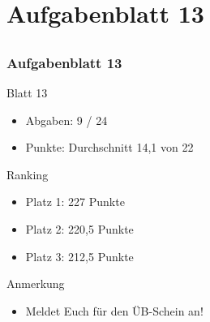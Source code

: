 \section[Rückblick]{Aufgabenblatt 13}
\subsection*{}
\begin{frame}
	\frametitle{Aufgabenblatt 13}
	\begin{block}{Blatt 13}
		\begin{itemize}
			\item Abgaben: 9 / 24
			\item Punkte: Durchschnitt 14,1 von 22
		\end{itemize}
   \end{block}
	\begin{block}{Ranking}
 		\begin{itemize}
 	  		\item Platz 1: 227 Punkte
 	  		\item Platz 2: 220,5 Punkte
			\item Platz 3: 212,5 Punkte
 	  \end{itemize}
	\end{block}
  \pause
	\begin{block}{Anmerkung}
  	\begin{itemize}
			\item Meldet Euch für den ÜB-Schein an!
		\end{itemize}
	\end{block}
\end{frame}

